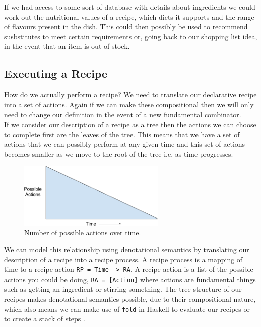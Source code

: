 \documentclass[11pt]{article}
\begin{document}
    If we had access to some sort of database with details about ingredients we could
    work out the nutritional values of a recipe, which diets it supports and the range
    of flavours present in the dish. This could then possibly be used to recommend
    susbstitutes to meet certain requirements or, going back to our shopping list idea,
    in the event that an item is out of stock. \\

    \subsection{Executing a Recipe}

    How do we actually perform a recipe? We need to translate our declarative
    recipe into a set of actions. Again if we can make these compositional
    then we will only need to change our definition in the event of a
    new fundamental combinator. \\
    
    If we consider our description of a recipe as a tree then the actions
    we can choose to complete first are the leaves of the tree. This means
    that we have a set of actions that we can possibly perform at any given
    time and this set of actions becomes smaller as we move to the root of
    the tree i.e. as time progresses. \\

    \begin{figure}[ht]
        \centering
            \includegraphics[width=7cm,keepaspectratio]{actions_time.png}
        \caption{Number of possible actions over time.}
    \end{figure}
    
    We can model this relationship using denotational semantics by translating
    our description of a recipe into a recipe process. A recipe process is a
    mapping of time to a recipe action \texttt{RP = Time -> RA}. A recipe action
    is a list of the possible actions you could be doing, \texttt{RA = [Action]}
    where actions are fundamental things such as getting an ingredient or stirring
    something. The tree structure of our recipes makes denotational semantics possible,
    due to their compositional nature, which also means we can make use of \texttt{fold}
    in Haskell to evaluate our recipes or to create a stack of steps \cite{hutton-fold}. \\
    
\end{document}
